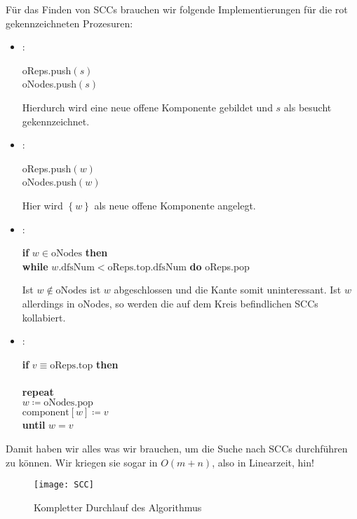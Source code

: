 Für das Finden von SCCs brauchen wir folgende Implementierungen für die rot gekennzeichneten Prozesuren:
\begin{itemize}
  \item \textbf{}:
  \begin{pseudocode}
    oReps.push\( (s) \) \\
    oNodes.push\( (s) \)
  \end{pseudocode}
  Hierdurch wird eine neue offene Komponente gebildet und \( s \) als besucht gekennzeichnet.

  \item \textbf{}:
  \begin{pseudocode}
    oReps.push\( (w) \) \\
    oNodes.push\( (w) \)
  \end{pseudocode}
  Hier wird \( \left \{ w \right \} \) als neue offene Komponente angelegt.

  \item \textbf{}:
  \begin{pseudocode}
    \textbf{if} \( w \in \text{oNodes} \) \textbf{then} \\
    \phantom{\enskip} \textbf{while} \( w\text{.dfsNum} < \text{oReps.top.dfsNum} \) \textbf{do} oReps.pop
  \end{pseudocode}
  Ist \( w \not \in \text{oNodes} \) ist \( w \) abgeschlossen und die Kante somit uninteressant. Ist \( w \) allerdings in oNodes, so werden die auf dem Kreis befindlichen SCCs kollabiert.

  \item \textbf{}:
  \begin{pseudocode}
    \textbf{if} \( v \equiv \text{oReps.top} \) \textbf{then} \\
    \phantom{\enskip}  \\
    \phantom{\enskip} \textbf{repeat} \\
    \phantom{\enskip} \phantom{\enskip} \( w \coloneqq \text{oNodes.pop} \) \\
    \phantom{\enskip} \phantom{\enskip} \( \text{component}[w] \coloneqq v \) \\
    \phantom{\enskip} \textbf{until} \( w = v \)
  \end{pseudocode}
\end{itemize}

Damit haben wir alles was wir brauchen, um die Suche nach SCCs durchführen zu können. Wir kriegen sie sogar in \( O(m+n) \), also in Linearzeit, hin!

\begin{figure}[H]
  \texttt{[image: SCC]}
  \caption{Kompletter Durchlauf des Algorithmus}
\end{figure}